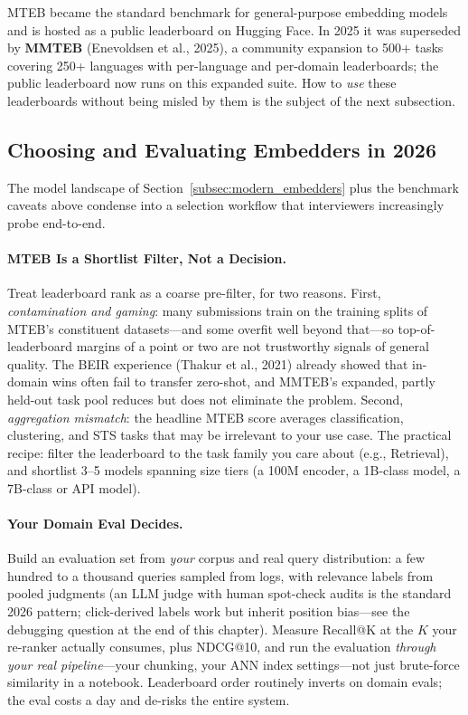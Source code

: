 MTEB became the standard benchmark for general-purpose embedding models and
is hosted as a public leaderboard on Hugging Face.  In 2025 it was
superseded by \textbf{MMTEB} (Enevoldsen et al., 2025), a community
expansion to 500+ tasks covering 250+ languages with per-language and
per-domain leaderboards; the public leaderboard now runs on this expanded
suite.  How to \emph{use} these leaderboards without being misled by them
is the subject of the next subsection.

\subsection{Choosing and Evaluating Embedders in 2026}
\label{subsec:choosing_embedders}

The model landscape of Section~\ref{subsec:modern_embedders} plus the
benchmark caveats above condense into a selection workflow that interviewers
increasingly probe end-to-end.

\paragraph{MTEB Is a Shortlist Filter, Not a Decision.}
Treat leaderboard rank as a coarse pre-filter, for two reasons.  First,
\emph{contamination and gaming}: many submissions train on the training
splits of MTEB's constituent datasets---and some overfit well beyond
that---so top-of-leaderboard margins of a point or two are not trustworthy
signals of general quality.  The BEIR experience (Thakur et al., 2021)
already showed that in-domain wins often fail to transfer zero-shot, and
MMTEB's expanded, partly held-out task pool reduces but does not eliminate
the problem.  Second, \emph{aggregation mismatch}: the headline MTEB score
averages classification, clustering, and STS tasks that may be irrelevant to
your use case.  The practical recipe: filter the leaderboard to the task
family you care about (e.g., Retrieval), and shortlist 3--5 models spanning
size tiers (a 100M encoder, a 1B-class model, a 7B-class or API model).

\paragraph{Your Domain Eval Decides.}
Build an evaluation set from \emph{your} corpus and real query
distribution: a few hundred to a thousand queries sampled from logs, with
relevance labels from pooled judgments (an LLM judge with human spot-check
audits is the standard 2026 pattern; click-derived labels work but inherit
position bias---see the debugging question at the end of this chapter).  Measure Recall@K at the $K$ your re-ranker
actually consumes, plus NDCG@10, and run the evaluation \emph{through your
real pipeline}---your chunking, your ANN index settings---not just
brute-force similarity in a notebook.  Leaderboard order routinely inverts
on domain evals; the eval costs a day and de-risks the entire system.

